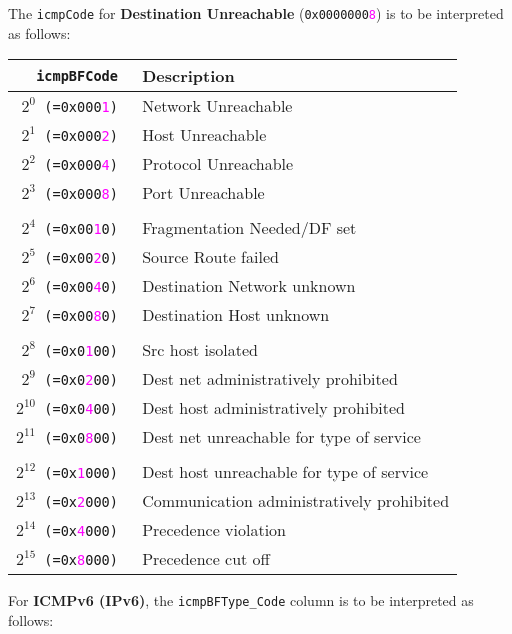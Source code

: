 \documentclass[documentation]{subfiles}
\begin{document}
~\\\\
The {\tt icmpCode} for {\bf Destination Unreachable} ({\tt 0x0000000\textcolor{magenta}{8}}) is to be interpreted as follows:\\
\begin{longtable}{>{\tt}rl}
    \toprule
    {\bf icmpBFCode} & {\bf Description}\\
    \midrule\endhead%
    $2^0$ (=0x000\textcolor{magenta}{1}) & Network Unreachable \\
    $2^1$ (=0x000\textcolor{magenta}{2}) & Host Unreachable \\
    $2^2$ (=0x000\textcolor{magenta}{4}) & Protocol Unreachable \\
    $2^3$ (=0x000\textcolor{magenta}{8}) & Port Unreachable \\
    \\
    $2^4$ (=0x00\textcolor{magenta}{1}0) & Fragmentation Needed/DF set \\
    $2^5$ (=0x00\textcolor{magenta}{2}0) & Source Route failed \\
    $2^6$ (=0x00\textcolor{magenta}{4}0) & Destination Network unknown \\
    $2^7$ (=0x00\textcolor{magenta}{8}0) & Destination Host unknown \\
    \\
    $2^{8}$  (=0x0\textcolor{magenta}{1}00) & Src host isolated\\
    $2^{9}$  (=0x0\textcolor{magenta}{2}00) & Dest net administratively prohibited \\
    $2^{10}$ (=0x0\textcolor{magenta}{4}00) & Dest host administratively prohibited \\
    $2^{11}$ (=0x0\textcolor{magenta}{8}00) & Dest net unreachable for type of service \\
    \\
    $2^{12}$ (=0x\textcolor{magenta}{1}000) & Dest host unreachable for type of service \\
    $2^{13}$ (=0x\textcolor{magenta}{2}000) & Communication administratively prohibited \\
    $2^{14}$ (=0x\textcolor{magenta}{4}000) & Precedence violation \\
    $2^{15}$ (=0x\textcolor{magenta}{8}000) & Precedence cut off \\
    \bottomrule
\end{longtable}

\clearpage
For {\bf ICMPv6 (IPv6)}, the {\tt icmpBFType\_Code} column is to be interpreted as follows:\\
\end{document}
